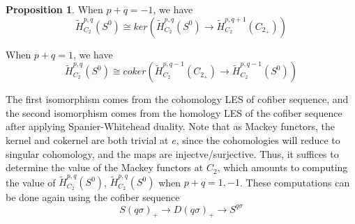 \documentclass{article}
\theoremstyle{definition}
\theoremstyle{definition}
\theoremstyle{definition}
\theoremstyle{definition}
\newtheorem{proposition}{Proposition}[theorem]
\theoremstyle{definition}
\theoremstyle{definition}
\theoremstyle{definition}
\begin{document}
\begin{tcolorbox}[colback=blue!5!white,colframe=blue!30!white]
\begin{proposition}
When $p+q=-1$, we have 
\[\tilde{H}^{p,q}_{C_2}(S^0)\cong ker(\tilde{H}_{C_2}^{p,q}(S^0)\to \tilde{H}_{C_2}^{p,q+1}(C_{2_+}))\]

When $p+q=1$, we have 
\[\tilde{H}^{p,q}_{C_2}(S^0)\cong coker(\tilde{H}_{C_2}^{p,q-1}(C_{2_+})\to \tilde{H}_{C_2}^{p,q-1}(S^0))\]
\end{proposition}
\end{tcolorbox}
The first isomorphism comes from the cohomology LES of cofiber sequence, and the second isomorphism comes from the homology LES of the cofiber sequence after applying Spanier-Whitehead duality. Note that as Mackey functors, the kernel and cokernel are both trivial at $e$, since the cohomologies will reduce to singular cohomology, and the maps are injectve/surjective. Thus, it suffices to determine the value of the Mackey functors at $C_2$, which amounts to computing the value of $\tilde{H}^{p,q}_{C_2}(S^0)$, $\tilde{H}^{p,q}_{C_2}(S^0)$ when $p+q=1,-1$. These computations can be done again using the cofiber sequence 
\[S(q\sigma)_{+}\to D(q\sigma)_+\to S^{q\sigma}\]
\end{document}
